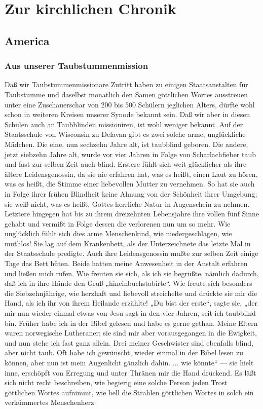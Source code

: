 \chapter{Zur kirchlichen Chronik}

\section{America}

\subsection{Aus unserer Taubstummenmission}

Daß wir Taubstummenmissionare Zutritt haben zu einigen Staatsanstalten für Taubstumme und daselbst monatlich den Samen göttlichen Wortes ausstreuen unter eine Zuschauerschar von 200 bis 500 Schülern jeglichen Alters, dürfte wohl schon in weiteren Kreisen unserer Synode bekannt sein. Daß wir aber in diesen Schulen auch an Taubblinden missioniren, ist wohl weniger bekannt. Auf der Staatsschule von Wisconsin zu Delavan gibt es zwei solche arme, unglückliche Mädchen. Die eine, nun sechzehn Jahre alt, ist taubblind geboren. Die andere, jetzt siebzehn Jahre alt, wurde vor vier Jahren in Folge von Scharlachfieber taub und fast zur selben Zeit auch blind. Erstere fühlt sich weit glücklicher als ihre ältere Leidensgenossin, da sie nie erfahren hat, was es heißt, einen Laut zu hören, was es heißt, die Stimme einer liebevollen Mutter zu vernehmen. So hat sie auch in Folge ihrer frühen Blindheit keine Ahnung von der Schönheit ihrer Umgebung; sie weiß nicht, was es heißt, Gottes herrliche Natur in Augenschein zu nehmen. Letztere hingegen hat bis zu ihrem dreizehnten Lebensjahre ihre vollen fünf Sinne gehabt und vermißt in Folge dessen die verlorenen nun um so mehr. Wie unglücklich fühlt sich dies arme Menschenkind, wie niedergeschlagen, wie muthlos! Sie lag auf dem Krankenbett, als der Unterzeichnete das letzte Mal in der Staatsschule predigte. Auch ihre Leidensgenossin mußte zur selben Zeit einige Tage das Bett hüten. Beide hatten meine Anwesenheit in der Anstalt erfahren und ließen mich rufen. Wie freuten sie sich, als ich sie begrüßte, nämlich dadurch, daß ich in ihre Hände den Gruß „hineinbuchstabirte“. Wie freute sich besonders die Siebzehnjährige, wie herzhaft und liebevoll streichelte und drückte sie mir die Hand, als ich ihr von ihrem Heilande erzählte! „Du bist der erste“, sagte sie, „der mir nun wieder einmal etwas von Jesu sagt in den vier Jahren, seit ich taubblind bin. Früher habe ich in der Bibel gelesen und habe es gerne gethan. Meine Eltern waren norwegische Lutheraner; sie sind mir aber vorausgegangen in die Ewigkeit, und nun stehe ich fast ganz allein. Drei meiner Geschwister sind ebenfalls blind, aber nicht taub. Oft habe ich gewünscht, wieder einmal in der Bibel lesen zu können, aber nun ist mein Augenlicht gänzlich dahin. ... wie könnte“ — sie hielt inne, erschöpft von Erregung und unter Thränen mir die Hand drückend. Es läßt sich nicht recht beschreiben, wie begierig eine solche Person jeden Trost göttlichen Wortes aufnimmt, wie hell die Strahlen göttlichen Wortes in solch ein verkümmertes Menschenherz 